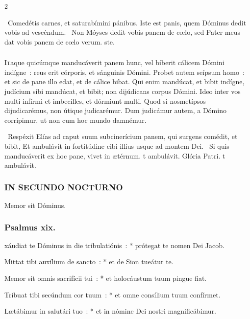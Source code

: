 \documentclass[9pt,twoside]{extarticle}
\begin{document}
\begin{multicols}{2}
{{\begin{tightlist}{}
\item {}~Comedétis carnes, et saturabímini pánibus. \textred{*} Iste est panis, quem Dóminus dedit vobis ad vescéndum. ~Non Móyses dedit vobis panem de cœlo, sed Pater meus dat vobis panem de cœlo verum. ste.
\end{tightlist}

\subsubsection*{\center{}}
\lettrine{I}taque quicúmque manducáverit panem hunc, vel bíberit cálicem Dómini indígne~: reus erit córporis, et sánguinis Dómini. Probet autem seípsum homo~: et sic de pane illo edat, et de cálice bibat. Qui enim mandúcat, et bibit indígne, judícium sibi mandúcat, et bibit; non dijúdicans corpus Dómini. Ideo inter vos multi infírmi et imbecílles, et dórmiunt multi. Quod si nosmetípsos dijudicarémus, non útique judicarémur. Dum judicámur autem, a Dómino corrípimur, ut non cum hoc mundo damnémur.

\begin{tightlist}{}
\item {}~Respéxit Elías ad caput suum subcinerícium panem, qui surgens comédit, et bibit, \textred{*} Et ambulávit in fortitúdine cibi illíus usque ad montem Dei. ~Si quis manducáverit ex hoc pane, vivet in ætérnum. t ambulávit. Glória Patri. t ambulávit.
\end{tightlist}

\subsubsection*{\center \textsc{IN SECUNDO NOCTURNO}}
 Memor sit Dóminus.
\subsubsection*{\center Psalmus xix.}
xáudiat te Dóminus in die tribulatiónis~: * prótegat te nomen Dei Jacob.

Mittat tibi auxílium de sancto~: * et de Sion tueátur te.

Memor sit omnis sacrifícii tui~: * et holocáustum tuum pingue fiat.

Tríbuat tibi secúndum cor tuum~: * et omne consílium tuum confírmet.

Lætábimur in salutári tuo~: * et in nómine Dei nostri magnificábimur.

}}
\end{multicols}
\end{document}
